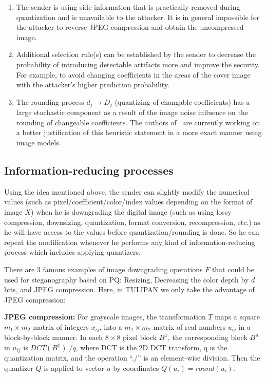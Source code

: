 \begin{enumerate}
\item The sender is using side information that is practically removed during quantization and is unavailable to the attacker. It is in general impossible for the attacker to reverse JPEG compression and obtain the uncompressed image.
\item Additional selection rule(s) can be established by the sender to decrease the probability of introducing detectable artifacts more and improve the security. For example, to avoid changing coefficients in the areas of the cover image with the attacker's higher prediction probability.
\item The rounding process $d_j \rightarrow D_j$ (quantizing of changable coefficients) has a large stochastic component as a result of the image noise influence on the rounding of changeable coefficients. The authors of~\cite{PQ04} are currently working on a better justification of this heuristic statement in a more exact manner using image models.

\end{enumerate}

\subsection{Information-reducing processes}
Using the idea mentioned above, the sender can slightly modify the numerical values (such as pixel/coefficient/color/index values depending on the format of image $X$) when he is downgrading the digital image (such as using lossy compression, downsizing, quantization, format conversion, recompression, etc.) as he will have access to the values before quantization/rounding is done. So he can repeat the modification whenever he performs any kind of information-reducing process which includes applying quantizers.
 
There are 3 famous examples of image downgrading operations $F$ that could be used for steganography based on PQ: Resizing, Decreasing the color depth by $d$ bits, and JPEG compression. Here, in TULIPAN we only take the advantage of JPEG compression:

{\bf JPEG compression:} For grayscale images, the transformation $T$ maps a square $m_1\times m_2$ matrix of integers $x_{ij}$, into a $m_1\times m_2$ matrix of real numbers $u_{ij}$ in a block-by-block manner. In each $8\times 8$ pixel block $B^x$, the corresponding block $B^u$ in $u_{ij}$ is $DCT(B^x)./q$, where DCT is the 2D DCT transform, q is the quantization matrix, and the operation “./” is an element-wise division. Then the quantizer $Q$ is applied to vector $u$ by coordinates $Q(u_i) = round(u_i)$.

